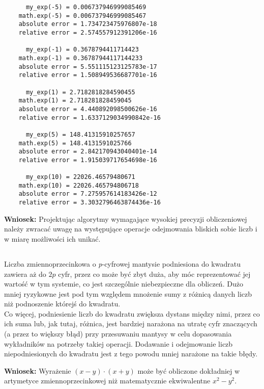 \documentclass{article}
\begin{document}
\begin{itemize}
\begin{verbatim}
      my_exp(-5) = 0.006737946999085469
    math.exp(-5) = 0.006737946999085467
    absolute error = 1.734723475976807e-18
    relative error = 2.574557912391206e-16
    
      my_exp(-1) = 0.3678794411714423
    math.exp(-1) = 0.36787944117144233
    absolute error = 5.551115123125783e-17
    relative error = 1.508949536687701e-16
    
      my_exp(1) = 2.7182818284590455
    math.exp(1) = 2.718281828459045
    absolute error = 4.440892098500626e-16
    relative error = 1.6337129034990842e-16
    
      my_exp(5) = 148.41315910257657
    math.exp(5) = 148.4131591025766
    absolute error = 2.842170943040401e-14
    relative error = 1.915039717654698e-16
    
      my_exp(10) = 22026.46579480671
    math.exp(10) = 22026.465794806718
    absolute error = 7.275957614183426e-12
    relative error = 3.3032796463874436e-16
    \end{verbatim}
\end{itemize}
\textbf{Wniosek:} Projektując algorytmy wymagające wysokiej precyzji obliczeniowej należy zwracać uwagę na występujące operacje odejmowania bliskich sobie liczb i w miarę możliwości ich unikać.

\subsection{}
Liczba zmiennoprzecinkowa o \textit{p}-cyfrowej mantysie podniesiona do kwadratu zawiera aż do \(2p\) cyfr, przez co może być zbyt duża, aby móc reprezentować jej wartość w tym systemie, co jest szczególnie niebezpieczne dla obliczeń. Dużo mniej ryzykowne jest pod tym względem mnożenie sumy z różnicą danych liczb niż podnoszenie którejś do kwadratu.\\
Co więcej, podniesienie liczb do kwadratu zwiększa dystans między nimi, przez co ich suma lub, jak tutaj, różnica, jest bardziej narażona na utratę cyfr znaczących (a przez to większy błąd) przy przesuwaniu mantysy w celu dopasowania wykładników na potrzeby takiej operacji. Dodawanie i odejmowanie liczb niepodniesionych do kwadratu jest z tego powodu mniej narażone na takie błędy.

\vspace{3mm}
\noindent
\textbf{Wniosek:} Wyrażenie \((x - y)\cdot(x + y)\) może być obliczone dokładniej w artymetyce zmiennoprzecinkowej niż matematycznie ekwiwalentne \(x^2 - y^2\).
\end{document}

